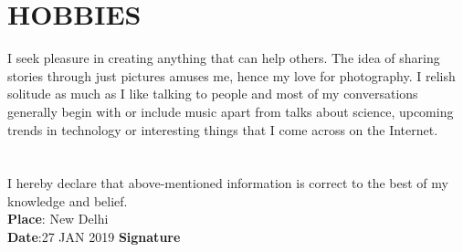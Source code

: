 \documentclass[margin, 10pt]{res}
\begin{document}
\begin{resume}
    
    \section{HOBBIES}
    I seek pleasure in creating anything that can help others. The idea of sharing stories through just pictures amuses me, hence my love for photography. I relish solitude as much as I like talking to people and most of my conversations generally begin with or include music apart from talks about science, upcoming trends in technology or interesting things that I come across on the Internet.
    \\

    \section{}
    I hereby declare that above-mentioned information is correct to the best of my knowledge and belief.\\

    {\bf Place}: New Delhi\\
    {\bf Date}:27 JAN 2019 \null\hfill {\bf Signature}\\
    \end{resume}
    
\end{document}
